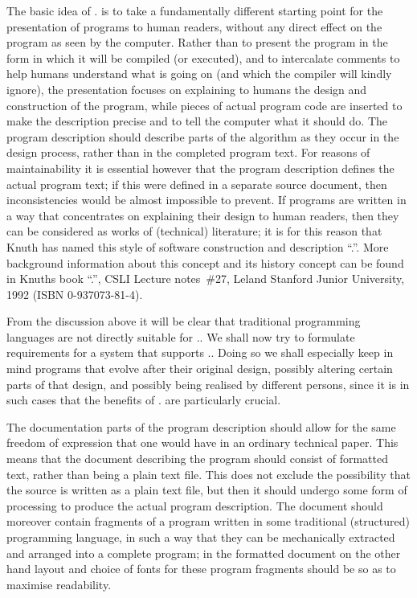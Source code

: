 The basic idea of \lp. is to take a fundamentally different starting point
for the presentation of programs to human readers, without any direct effect
on the program as seen by the computer. Rather than to present the program
in the form in which it will be compiled (or executed), and to intercalate
comments to help humans understand what is going on (and which the compiler
will kindly ignore), the presentation focuses on explaining to humans the
design and construction of the program, while pieces of actual program code
are inserted to make the description precise and to tell the computer what
it should do. The program description should describe parts of the algorithm
as they occur in the design process, rather than in the completed program
text. For reasons of maintainability it is essential however that the
program description defines the actual program text; if this were defined in
a separate source document, then inconsistencies would be almost impossible
to prevent. If programs are written in a way that concentrates on explaining
their design to human readers, then they can be considered as works of
(technical) literature; it is for this reason that Knuth has named this
style of software construction and description ``\lp.''. More background
information about this concept and its history concept can be found in
Knuths book ``\LP.'', CSLI Lecture notes~\#27, Leland Stanford Junior
University, 1992 (ISBN 0-937073-81-4).

From the discussion above it will be clear that traditional programming
languages are not directly suitable for \lp.. We shall now try to formulate
requirements for a system that supports \lp.. Doing so we shall especially
keep in mind programs that evolve after their original design, possibly
altering certain parts of that design, and possibly being realised by
different persons, since it is in such cases that the benefits of \lp. are
particularly crucial.

The documentation parts of the program description should allow for the same
freedom of expression that one would have in an ordinary technical paper.
This means that the document describing the program should consist of
formatted text, rather than being a plain text file. This does not exclude
the possibility that the source is written as a plain text file, but then it
should undergo some form of processing to produce the actual program
description. The document should moreover contain fragments of a program
written in some traditional (structured) programming language, in such a way
that they can be mechanically extracted and arranged into a complete
program; in the formatted document on the other hand layout and choice of
fonts for these program fragments should be so as to maximise readability.


